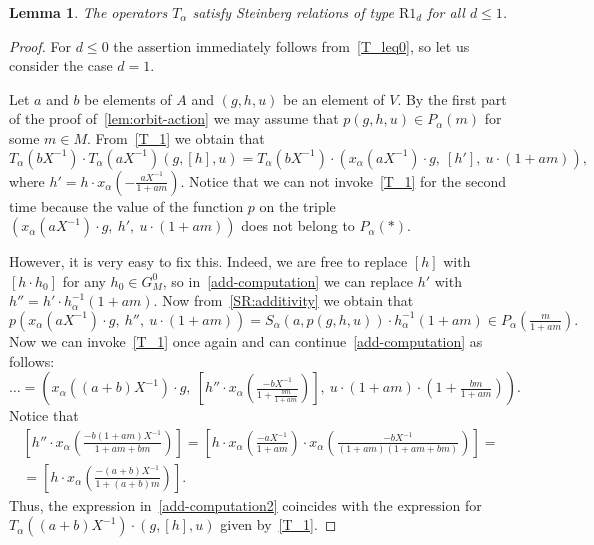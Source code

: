 \documentclass[oneside, 8pt]{amsart}
\newtheorem{lemma}{Lemma}
\theoremstyle{remark}
\theoremstyle{definition}
\numberwithin{lemma}{section}
\numberwithin{prop}{section}
\numberwithin{corollary}{section}
\numberwithin{externaltheorem}{section}
\numberwithin{equation}{section}
\begin{document}
\begin{lemma} \label{R1_d} The operators $T_\alpha$ satisfy Steinberg relations of type $\mathrm{R1}_d$ for all $d \leq 1$. \end{lemma}
\begin{proof}
 For $d \leq 0$ the assertion immediately follows from~\eqref{T_leq0}, so let us consider the case $d = 1$. 
 
 Let $a$ and $b$ be elements of $A$ and $(g, h, u)$ be an element of $V$.
 By the first part of the proof of~\cref{lem:orbit-action} we may assume that $p(g,h,u)\in P_\alpha(m)$ for some $m \in M$.
 From~\eqref{T_1} we obtain that 
 \begin{equation}\label{add-computation}
  T_\alpha(bX^{-1}) \cdot T_\alpha(aX^{-1}) (g, [h], u) = T_\alpha(bX^{-1}) \cdot \left(x_\alpha(aX^{-1})\cdot g ,\ \left[ h' \right],\ u \cdot (1 + am)\right),
 \end{equation}
 where $h' = h \cdot x_\alpha\left(-\tfrac{aX^{-1}}{1 + am}\right)$.
 Notice that we can not invoke~\eqref{T_1} for the second time because the value of the function $p$ on the triple $(x_\alpha(aX^{-1})\cdot g ,\ h',\ u \cdot (1 + am))$ does not belong to $P_\alpha(*)$.
 
 However, it is very easy to fix this. Indeed, we are free to replace $[h]$ with $[h \cdot h_0]$ for any $h_0 \in G_M^0$, so in~\eqref{add-computation} we
  can replace $h'$ with $h'' = h' \cdot h^{-1}_\alpha(1+am)$. Now from~\cref{SR:additivity} we obtain that
 \[ p(x_\alpha(aX^{-1})\cdot g ,\ h'',\ u \cdot (1 + am)) = S_\alpha(a, p(g, h, u)) \cdot h^{-1}_\alpha(1+am) \in P_\alpha\left(\tfrac{m}{1+am}\right).\]
 Now we can invoke~\eqref{T_1} once again and can continue~\eqref{add-computation} as follows:
 \begin{equation}\label{add-computation2}
  \ldots = \left(x_\alpha((a + b)X^{-1})\cdot g ,\ \left[ h'' \cdot x_\alpha\left(\tfrac{-bX^{-1}}{1+\tfrac{bm}{1+am}}\right) \right],\ u \cdot (1 + am) \cdot \left(1+\tfrac{bm}{1+am}\right)\right).\end{equation}
 Notice that 
 \begin{multline} \nonumber \left[h'' \cdot x_\alpha\left(\tfrac{-b(1+am)X^{-1}}{1+am + bm}\right)\right] = \left[h \cdot x_\alpha\left(\tfrac{-aX^{-1}}{1 + am}\right) \cdot x_\alpha\left(\tfrac{-bX^{-1}}{(1+am)(1+am+bm)}\right)\right] = \\ =
 \left[h \cdot x_\alpha\left(\tfrac{-(a+b)X^{-1}}{1+(a+b)m}\right)\right].\end{multline}
 Thus, the expression in~\eqref{add-computation2} coincides with the expression for $T_\alpha((a+b)X^{-1})\cdot (g, [h], u)$ given by~\eqref{T_1}. \end{proof}
\end{document}
